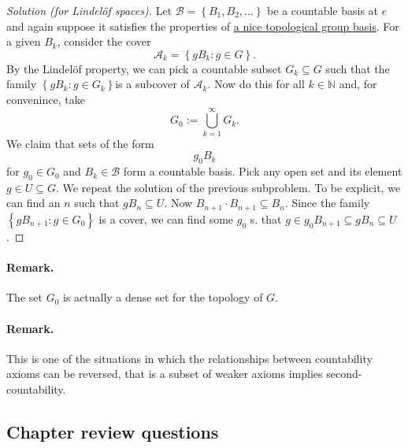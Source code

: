 \begin{proof}[Solution (for Lindel\"of spaces)]
    Let \( \mathcal{B} = \left\{ B_1, B_2, \ldots \right\} \) be a countable basis at \( e \) and again suppose it satisfies the properties of \hyperlink{TopGroupLocalBasis}{a nice topological group basis}. For a given \( B_k \), consider the cover
    \[ 
       \mathcal{A}_k = \left\{ gB_k : g \in G \right\}.
   \]
   By the Lindel\"of property, we can pick a countable subset \( G_k \subseteq G \) such that the family \( \left\{ gB_k : g \in G_k \right\} \)is a subcover of \( \mathcal{A}_k \). Now do this for all \( k \in \mathbb{N} \) and, for convenince, take
   \[ 
       G_0 := \bigcup_{k=1}^\infty G_k. 
  \]
  We claim that sets of the form
  \[ 
     g_0B_k 
 \]
 for \( g_0 \in G_0 \) and \( B_k \in \mathcal{B} \) form a countable basis. Pick any open set and its element \( g \in U \subseteq G \). We repeat the solution of the previous subproblem. To be explicit, we can find an \( n \) such that \( gB_n \subseteq U \). Now \( B_{n+1} \cdot B_{n+1} \subseteq B_{n} \). Since the family \( \left\{ gB_{n+1} : g \in G_0 \right\} \) is a cover, we can find some \( g_0 \) s. that \( g \in g_0B_{n+1} \subseteq gB_n \subseteq U \).
\end{proof}

\paragraph{Remark.} The set \( G_0 \) is actually a dense set for the topology of \( G \).

\paragraph{Remark.} This is one of the situations in which the relationships between countability axioms can be reversed, that is a subset of weaker axioms implies second-countability.

\subsection{Chapter review questions}

